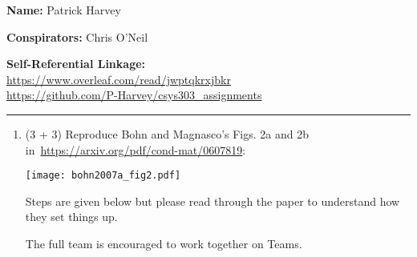 \textbf{Name:} Patrick Harvey\\

\medskip

\textbf{Conspirators:} Chris O'Neil\\

\medskip

\textbf{Self-Referential Linkage:}\\
\url{https://www.overleaf.com/read/jwptqkrxjbkr}\\
\url{https://github.com/P-Harvey/csys303_assignments}\\

\medskip
\medskip

\hrule

\medskip


\begin{enumerate}

\item (3 + 3)
  Reproduce Bohn and Magnasco's Figs. 2a and 2b in~\url{https://arxiv.org/pdf/cond-mat/0607819}:

  \texttt{[image: bohn2007a\_fig2.pdf]}

  Steps are given below but please read through the paper to understand how they set things up.

  The full team is encouraged to work together on Teams.



\end{enumerate}
